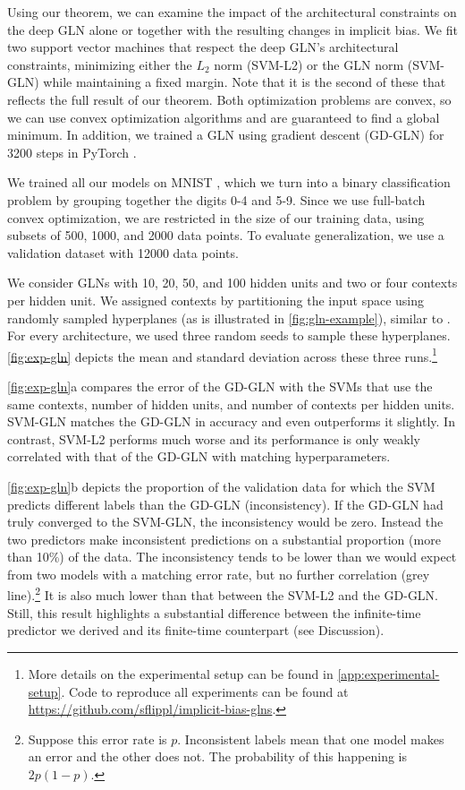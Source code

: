 \documentclass{article}
\theoremstyle{plain}
\theoremstyle{definition}
\theoremstyle{remark}
\begin{document}
Using our theorem, we can examine the impact of the architectural constraints on the deep GLN alone or together with the resulting changes in implicit bias.
We fit two support vector machines that respect the deep GLN's architectural constraints, minimizing either the $L_2$ norm (SVM-L2) or the GLN norm (SVM-GLN) while maintaining a fixed margin.  Note that it is the second of these that reflects the full result of our theorem.
Both optimization problems are convex, so we can use convex optimization algorithms \citep{diamond_cvxpy_2016} and are guaranteed to find a global minimum.
In addition, we trained a GLN using gradient descent (GD-GLN) for 3200 steps in PyTorch \citep{paszke_pytorch_2019}.

We trained all our models on MNIST \citep{lecun_mnist_2010}, which we turn into a binary classification problem by grouping together the digits 0-4 and 5-9.
Since we use full-batch convex optimization, we are restricted in the size of our training data, using subsets of 500, 1000, and 2000 data points.
To evaluate generalization, we use a validation dataset with 12000 data points.

We consider GLNs with 10, 20, 50, and 100 hidden units and two or four contexts per hidden unit.
We assigned contexts by partitioning the input space using randomly sampled hyperplanes (as is illustrated in \cref{fig:gln-example}), similar to \citet{veness_online_2017}.
For every architecture, we used three random seeds to sample these hyperplanes.
\cref{fig:exp-gln} depicts the mean and standard deviation across these three runs.\footnote{More details on the experimental setup can be found in \cref{app:experimental-setup}. Code to reproduce all experiments can be found at \url{https://github.com/sflippl/implicit-bias-glns}.}

\cref{fig:exp-gln}a compares the error of the GD-GLN with the SVMs that use the same contexts, number of hidden units, and number of contexts per hidden units.
SVM-GLN matches the GD-GLN in accuracy and even outperforms it slightly.
In contrast, SVM-L2 performs much worse and its performance is only weakly correlated with that of the GD-GLN with matching hyperparameters.

\cref{fig:exp-gln}b depicts the proportion of the validation data for which the SVM predicts different labels than the GD-GLN (inconsistency).
If the GD-GLN had truly converged to the SVM-GLN, the inconsistency would be zero.
Instead the two predictors make inconsistent predictions on a substantial proportion (more than 10\%) of the data.
The inconsistency tends to be lower than we would expect from two models with a matching error rate, but no further correlation (grey line).\footnote{Suppose this error rate is $p$. Inconsistent labels mean that one model makes an error and the other does not. The probability of this happening is $2p(1-p)$.\label{fn:inconsistency}}
It is also much lower than that between the SVM-L2 and the GD-GLN.
Still, this result highlights a substantial difference between the infinite-time predictor we derived and its finite-time counterpart (see Discussion).
\end{document}
